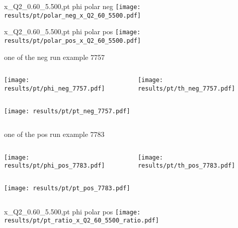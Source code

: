 \begin{frame}{x\_Q2\_0.60\_5.500,pt phi polar neg}
\texttt{[image: results/pt/polar\_neg\_x\_Q2\_60\_5500.pdf]}
\end{frame}
\begin{frame}{x\_Q2\_0.60\_5.500,pt phi polar pos}
\texttt{[image: results/pt/polar\_pos\_x\_Q2\_60\_5500.pdf]}
\end{frame}
\begin{frame}{one of the neg run example 7757}
\begin{columns}
\begin{column}[T]{0.5\textwidth}
\texttt{[image: results/pt/phi\_neg\_7757.pdf]}
\end{column}
\begin{column}[T]{0.5\textwidth}
\texttt{[image: results/pt/th\_neg\_7757.pdf]}
\end{column}
\end{columns}
\begin{columns}
\begin{column}[T]{0.5\textwidth}
\texttt{[image: results/pt/pt\_neg\_7757.pdf]}
\end{column}
\begin{column}[T]{0.5\textwidth}
\end{column}
\end{columns}
\end{frame}
\begin{frame}{one of the pos run example 7783}
\begin{columns}
\begin{column}[T]{0.5\textwidth}
\texttt{[image: results/pt/phi\_pos\_7783.pdf]}
\end{column}
\begin{column}[T]{0.5\textwidth}
\texttt{[image: results/pt/th\_pos\_7783.pdf]}
\end{column}
\end{columns}
\begin{columns}
\begin{column}[T]{0.5\textwidth}
\texttt{[image: results/pt/pt\_pos\_7783.pdf]}
\end{column}
\begin{column}[T]{0.5\textwidth}
\end{column}
\end{columns}
\end{frame}
\begin{frame}{x\_Q2\_0.60\_5.500,pt phi polar pos}
\texttt{[image: results/pt/pt\_ratio\_x\_Q2\_60\_5500\_ratio.pdf]}
\end{frame}

